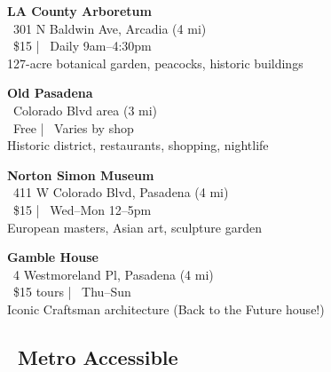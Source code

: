 \documentclass[10pt,letterpaper]{article}
\begin{document}
\begin{infobox}[colback=gray!10,colframe=gray]
\textbf{LA County Arboretum}\\
\faMapMarker\ 301 N Baldwin Ave, Arcadia (4 mi)\\
\faDollarSign\ \$15 | \faClock\ Daily 9am--4:30pm\\
127-acre botanical garden, peacocks, historic buildings
\end{infobox}

\begin{infobox}[colback=gray!10,colframe=gray]
\textbf{Old Pasadena}\\
\faMapMarker\ Colorado Blvd area (3 mi)\\
\faDollarSign\ Free | \faClock\ Varies by shop\\
Historic district, restaurants, shopping, nightlife
\end{infobox}

\begin{infobox}[colback=gray!10,colframe=gray]
\textbf{Norton Simon Museum}\\
\faMapMarker\ 411 W Colorado Blvd, Pasadena (4 mi)\\
\faDollarSign\ \$15 | \faClock\ Wed--Mon 12--5pm\\
European masters, Asian art, sculpture garden
\end{infobox}

\begin{infobox}[colback=gray!10,colframe=gray]
\textbf{Gamble House}\\
\faMapMarker\ 4 Westmoreland Pl, Pasadena (4 mi)\\
\faDollarSign\ \$15 tours | \faClock\ Thu--Sun\\
Iconic Craftsman architecture (Back to the Future house!)
\end{infobox}

\subsection*{\faSubway\ Metro Accessible}
\end{document}
